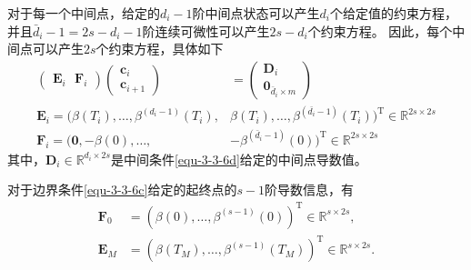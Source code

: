 \begin{tcolorbox}[blue]
对于每一个中间点，给定的\(d_i-1\)阶中间点状态可以产生\(d_i\)个给定值的约束方程，
并且\(\bar{d}_i-1=2s-d_i-1\)阶连续可微性可以产生\(2s-d_i\)个约束方程。
因此，每个中间点可以产生\(2s\)个约束方程，具体如下
\begin{align}
\begin{pmatrix}
\mathbf{E}_i \ \ \  \mathbf{F}_i 
\end{pmatrix}
\begin{pmatrix}
    \mathbf{c}_i  \\
    \mathbf{c}_{i+1} 
\end{pmatrix}&=
\begin{pmatrix}
    \mathbf{D}_i\\
    \mathbf{0}_{\bar{d}_i\times m}
\end{pmatrix}\label{equ-3-3-10}\\ 
\mathbf{E}_i=(\beta(T_i),\ldots,\beta^{(d_i-1)}(T_i),&\beta(T_i),\ldots,\beta^{(\bar{d_i}-1)}(T_i))^\mathrm{T}\in\mathbb{R}^{2s\times2s}\label{equ-3-3-11}\\ 
\mathbf{F}_i=(\mathbf{0},-\beta(0),\ldots,&-\beta^{(\bar{d}_i-1)}(0))^\mathrm{T}\in\mathbb{R}^{2s\times2s}\label{equ-3-3-12}
\end{align}
其中，\(\mathbf{D}_i \in\mathbb{R}^{d_i \times 2s}\)是中间条件\eqref{equ-3-3-6d}给定的中间点导数值。


对于边界条件\eqref{equ-3-3-6c}给定的起终点的\(s-1\)阶导数信息，有
\begin{align}
\mathbf{F}_{0}& =\left(\beta(0),\ldots,\beta^{(s-1)}(0)\right)^{\mathrm{T}}\in\mathbb{R}^{s\times2s}, \label{equ-3-3-15} \\
\mathbf{E}_{M}& =\left(\beta\left(T_M\right),\ldots,\beta^{\left(s-1\right)}\left(T_M\right)\right)^{\mathrm{T}}\in\mathbb{R}^{s\times2s}. \label{equ-3-3-16}
\end{align}
\end{tcolorbox}







